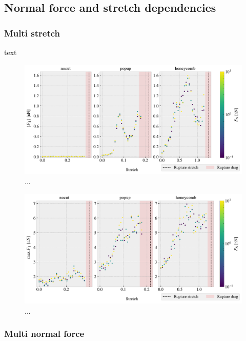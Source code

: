 \newpage
\subsection{Normal force and stretch dependencies}
\subsubsection{Multi stretch} 
text

\begin{figure}[H]
  \centering
  \includegraphics[width=\linewidth]{figures/baseline/multi_stretch_mean_compare.pdf}
  \caption{...}
  \label{fig:}
\end{figure}


\begin{figure}[H]
  \centering
  \includegraphics[width=\linewidth]{figures/baseline/multi_stretch_max_compare.pdf}
  \caption{...}
  \label{fig:}
\end{figure}

\subsubsection{Multi normal force}


